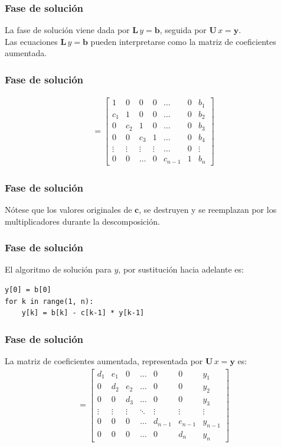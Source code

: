 \documentclass[12pt]{beamer}
\begin{document}
\begin{frame}
\frametitle{Fase de solución}
La fase de solución viene dada por $\mathbf{L} \, y = \mathbf{b}$, \pause seguida por $\mathbf{U} \, x = \mathbf{y}$.
\\
\medskip
\pause
Las ecuaciones $\mathbf{L} \, y = \mathbf{b}$ pueden interpretarse como la matriz de coeficientes aumentada.
\end{frame}
\begin{frame}
\frametitle{Fase de solución}
\renewcommand{\arraystretch}{1}
\begin{align*}
[\mathbf{L} \backslash \mathbf{b}] =
\begin{bmatrix}
1 & 0 & 0 & 0 & \ldots & 0 & b_{1} \\
c_{1} & 1 & 0 & 0 & \ldots & 0 & b_{2} \\
0 & c_{2} & 1 & 0 & \ldots & 0 & b_{3} \\
0 & 0 & c_{3} & 1 & \ldots & 0 & b_{4} \\
\vdots & \vdots & \vdots & \vdots & \ldots & 0 & \vdots \\
0 & 0 & \ldots & 0 & c_{n-1} & 1 & b_{n}
\end{bmatrix}
\end{align*}
\end{frame}
\begin{frame}[fragile]
\frametitle{Fase de solución}
Nótese que los valores originales de $\mathbf{c}$, se destruyen y se reemplazan por los multiplicadores durante la descomposición.
\end{frame}
\begin{frame}[fragile]
\frametitle{Fase de solución}
El algoritmo de solución para $y$, por sustitución hacia adelante es:
\begin{lstlisting}[caption=Sustitución hacia adelante]
y[0] = b[0]
for k in range(1, n):
    y[k] = b[k] - c[k-1] * y[k-1]
\end{lstlisting}
\end{frame}
\begin{frame}
\frametitle{Fase de solución}
La matriz de coeficientes aumentada, representada por $\mathbf{U} \, x = \mathbf{y}$ es:
\pause
\renewcommand{\arraystretch}{1}
\begin{align*}
[\mathbf{U} \backslash \mathbf{y}] =
\begin{bmatrix}
d_{1} & e_{1} & 0 & \ldots & 0 & 0 & y_{1} \\
0 & d_{2} & e_{2} & \ldots & 0 & 0 & y_{2} \\
0 & 0 & d_{3} & \ldots & 0 & 0 & y_{3} \\
\vdots & \vdots & \vdots & \ddots & \vdots & \vdots & \vdots \\
0 & 0 & 0 & \ldots & d_{n-1} & e_{n-1} & y_{n-1} \\
0 & 0 & 0 & \ldots & 0 & d_{n} & y_{n}
\end{bmatrix}
\end{align*}
\end{frame}
\end{document}
